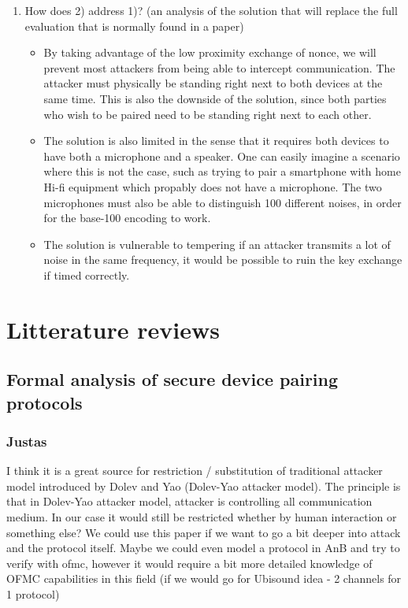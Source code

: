\documentclass[12pt]{article}
\begin{document}
\begin{enumerate}
    \item How does 2) address 1)?  (an analysis of the solution that will replace the full evaluation that is normally found in a paper)

    \begin{itemize}
        \item By taking advantage of the low proximity exchange of nonce, we will prevent most attackers from being able to intercept communication. The attacker must physically be standing right next to both devices at the same time.
        This is also the downside of the solution, since both parties who wish to be paired need to be standing right next to each other.
        \item The solution is also limited in the sense that it requires both devices to have both a microphone and a speaker. One can easily imagine a scenario where this is not the case, such as trying to pair a smartphone with home Hi-fi equipment which propably does not have a microphone. The two microphones must also be able to distinguish 100 different noises, in order for the base-100 encoding to work.
        \item The solution is vulnerable to tempering if an attacker transmits a lot of noise in the same frequency, it would be possible to ruin the key exchange if timed correctly.
    \end{itemize}

\end{enumerate}

\newpage

\section{Litterature reviews}

\subsection{Formal analysis of secure device pairing protocols}
\label{sub:Formal analysis of secure device pairing protocols}

\subsubsection{Justas}
\label{subs:Justas}

I think it is a great source for restriction / substitution of traditional attacker model introduced by Dolev and Yao (Dolev-Yao attacker model).
The principle is that in Dolev-Yao attacker model, attacker is controlling all communication medium. In our case it would still be restricted whether by human interaction or something else?
We could use this paper if we want to go a bit deeper into attack and the protocol itself. Maybe we could even model a protocol in AnB and  try to verify with ofmc, however it would require a bit more detailed knowledge of OFMC capabilities in this field (if we would go for Ubisound idea - 2 channels for 1 protocol)
\end{document}
